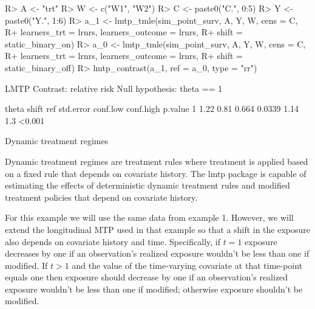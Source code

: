 \documentclass[twoside,11pt]{article}
\newenvironment{CodeChunk}{}{}
\newcommand{\pkg}[1]{{\fontseries{b}\selectfont #1}}
\begin{document}
\begin{CodeChunk}
\begin{CodeInput}
R> A <- "trt"
R> W <- c("W1", "W2")
R> C <- paste0("C.", 0:5)
R> Y <- paste0("Y.", 1:6)
R> a_1 <- lmtp_tmle(sim_point_surv, A, Y, W, cens = C, 
R+                   learners_trt = lrnrs, learners_outcome = lrnrs,
R+                   shift = static_binary_on)
R> a_0 <- lmtp_tmle(sim_point_surv, A, Y, W, cens = C, 
R+                   learners_trt = lrnrs, learners_outcome = lrnrs,
R+                   shift = static_binary_off)
R> lmtp_contrast(a_1, ref = a_0, type = "rr")
\end{CodeInput}

\begin{CodeOutput}
  LMTP Contrast: relative risk
Null hypothesis: theta == 1

  theta shift   ref std.error conf.low conf.high p.value
1  1.22  0.81 0.664    0.0339     1.14       1.3  <0.001
\end{CodeOutput}
\end{CodeChunk}

\hypertarget{example-4-dynamic-treatment-regimes}{
\begin{example}{Dynamic treatment regimes}
\end{example}}

Dynamic treatment regimes are treatment rules where treatment is applied based on a fixed rule that depends on covariate history. The \pkg{lmtp} package is capable of estimating the effects of deterministic dynamic treatment rules and modified treatment policies that depend on covariate history. 

For this example we will use the same data from example 1. However, we will extend the longitudinal MTP used in that example so that a shift in the exposure also depends on covariate history and time. Specifically, if $t = 1$ exposure decreases by one if an observation's realized exposure wouldn’t be less than one if modified. If $t > 1$ and the value of the time-varying covariate at that time-point equals one then exposure should decrease by one if an observation's realized exposure wouldn’t be less than one if modified; otherwise exposure shouldn't be modified.
\end{document}
